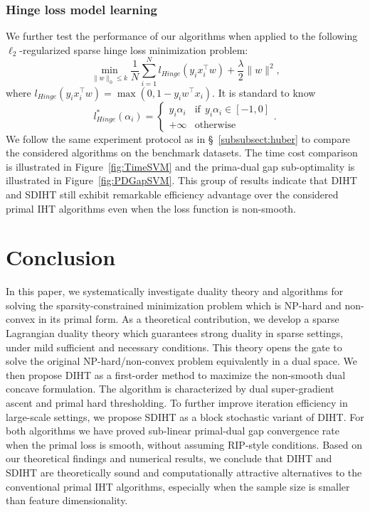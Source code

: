 \documentclass[11pt]{article}
\numberwithin{equation}{section}
\numberwithin{table}{section}
\numberwithin{figure}{section}
\begin{document}
\subsubsection{Hinge loss model learning}
We further test the performance of our algorithms when applied to the following $\ell_2$-regularized sparse hinge loss minimization problem:
\[
\min\limits_{\|w\|_0\le k} \frac{1}{N}\sum\limits_{i=1}^N l_{Hinge}(y_ix_i^{\top}w)+\frac{\lambda}{2}\|w\|^2,
\]
where $l_{Hinge}(y_ix_i^{\top}w)=\max(0,1-y_iw^{\top}x_i)$. It is standard to know~\cite{hsieh2008dual} \[l^{*}_{Hinge}(\alpha_i)=\left\{\begin{array}{ll}  y_i\alpha_i & \text{if}~~y_i\alpha_i\in [-1,0] \\
+\infty & \text{otherwise}\end{array}\right..\]
We follow the same experiment protocol as in \S~\ref{subsubsect:huber} to compare the considered algorithms on the benchmark datasets. The time cost comparison is illustrated in Figure~\ref{fig:TimeSVM} and the prima-dual gap sub-optimality is illustrated in Figure~\ref{fig:PDGapSVM}. This group of results indicate that DIHT and SDIHT still exhibit remarkable efficiency advantage over the considered primal IHT algorithms even when the loss function is non-smooth.
\vspace{-2mm}
\section{Conclusion}
\label{sect:conclusion}
In this paper, we systematically investigate duality theory and algorithms for solving the sparsity-constrained minimization problem which is NP-hard and non-convex in its primal form. As a theoretical contribution, we develop a sparse Lagrangian duality theory which guarantees strong duality in sparse settings, under mild sufficient and necessary conditions. This theory opens the gate to solve the original NP-hard/non-convex problem equivalently in a dual space. We then propose DIHT as a first-order method to maximize the non-smooth dual concave formulation. The algorithm is characterized by dual super-gradient ascent and primal hard thresholding. To further improve iteration efficiency in large-scale settings, we propose SDIHT as a block stochastic variant of DIHT. For both algorithms we have proved sub-linear primal-dual gap convergence rate when the primal loss is smooth, without assuming RIP-style conditions. Based on our theoretical findings and numerical results, we conclude that DIHT and SDIHT are theoretically sound and computationally attractive alternatives to the conventional primal IHT algorithms, especially when the sample size is smaller than feature dimensionality.
\vspace{-3mm}
\end{document}
